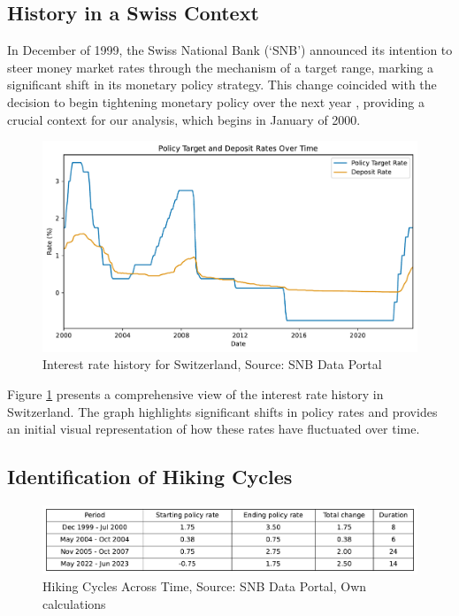 \documentclass{article}
\begin{document}
\subsection{History in a Swiss Context}

In December of 1999, the Swiss National Bank (‘SNB’) announced its intention to steer money market rates through the mechanism of a target range, marking a significant shift in its monetary policy strategy. This change coincided with the decision to begin tightening monetary policy over the next year \cite{snb1999monetary}, providing a crucial context for our analysis, which begins in January of 2000.

\begin{figure}[h]
    \centering
    \includegraphics[width=1\textwidth]{../../figures/rates_time_SNB.pdf}
    \caption{Interest rate history for Switzerland, Source: SNB Data Portal\cite{snb2023}}
    \label{fig:rates_time}
\end{figure}

Figure \ref{fig:rates_time} presents a comprehensive view of the interest rate history in Switzerland. The graph highlights significant shifts in policy rates and provides an initial visual representation of how these rates have fluctuated over time. 

\subsection{Identification of Hiking Cycles}

\begin{figure}[h!]
    \centering
    \includegraphics[width=1\textwidth]{../../figures/hiking_summary_SNB.pdf}
    \caption{Hiking Cycles Across Time, Source: SNB Data Portal\cite{snb2023}, Own calculations}
    \label{fig:hiking_cycles}
\end{figure}
\end{document}
